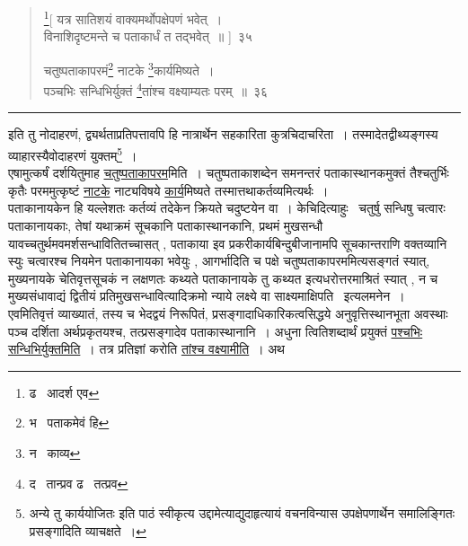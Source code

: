 \documentclass[11pt, openany]{book}
\begin{document}
\newpage

\begin{quote}
{\na \renewcommand{\thefootnote}{1}\footnote{ढ \textendash\ आदर्श एव}[ यत्र सातिशयं वाक्यमर्थोपक्षेपणं भवेत्~।\\
विनाशिदृष्टमन्ते च पताकार्धं त तद्भवेत्~॥ ]~३५

चतुष्पताकापरमं\renewcommand{\thefootnote}{2}\footnote{भ \textendash\ पताकमेवं हि} नाटके \renewcommand{\thefootnote}{3}\footnote{न \textendash\ काव्य}कार्यमिष्यते~।\\
पञ्चभिः सन्धिभिर्युक्तं \renewcommand{\thefootnote}{4}\footnote{द \textendash\ तान्प्रव ढ \textendash\ तत्प्रव}तांश्च वक्ष्याम्यतः परम्~॥~३६}
\end{quote}

\hrule

\vspace{2mm}
\noindent
इति तु नोदाहरणं, द्व्यर्थताप्रतिपत्तावपि हि नात्रार्थेन सहकारिता कुत्रचिदाचरिता~। तस्मादेतद्वीथ्यङ्गस्य व्याहारस्यैवोदाहरणं युक्तम्\renewcommand{\thefootnote}{1}\footnote{{\qt अन्ये तु कार्ययोजितः} इति पाठं स्वीकृत्य उद्दामेत्याद्युदाहृत्यायं वचनविन्यास उपक्षेपणार्थेन समालिङ्गितः प्रसङ्गादिति व्याचक्षते~।}~।\\

एषामुत्कर्षं दर्शयितुमाह \underline{चतुष्पताकापरम}मिति~। चतुष्पताकाशब्देन समनन्तरं पताकास्थानकमुक्तं तैश्चतुर्भिः कृतैः परममुत्कृष्टं \underline{नाटके} नाट्यविषये \underline{कार्य}मिष्यते तस्मात्तथाकर्तव्यमित्यर्थः~।\\

पताकानायकेन हि यल्लेशतः कर्तव्यं तदेकेन क्रियते चदुष्टयेन वा~। केचिदित्याहुः \textendash\ चतुर्षु सन्धिषु चत्वारः पताकानायकाः, तेषां यथाक्रमं सूचकानि पताकास्थानकानि, प्रथमं मुखसन्धौ यावच्चतुर्थमवमर्शसन्धावितितच्चासत् , पताकाया इव प्रकरीकार्यबिन्दुबीजानामपि सूचकान्तराणि वक्तव्यानि स्युः चत्वारश्च नियमेन पताकानायका भवेयुः , आगर्भादिति च पक्षे चतुष्पताकापरममित्यसङ्गतं स्यात्, मुख्यनायके चेतिवृत्तसूचकं न लक्षणतः कथ्यते पताकानायके तु कथ्यत इत्यधरोत्तरमाश्रितं स्यात् , न च मुख्यसंधावाद्यं द्वितीयं प्रतिमुखसन्धावित्यादिक्रमो न्याये लक्ष्ये वा साक्ष्यमाक्षिपति \textendash\ इत्यलमनेन~।\\

एवमितिवृत्तं व्याख्यातं, तस्य च भेदद्वयं निरूपितं, प्रसङ्गादाधिकारिकत्वसिद्धये अनुवृत्तिस्थानभूता अवस्थाः पञ्च दर्शिता अर्थप्रकृतयश्च, तत्प्रसङ्गादेव पताकास्थानानि~। अधुना त्वितिशब्दार्थं प्रयुक्तं \underline{पश्चभिः सन्धिभिर्युक्तमिति}~। तत्र प्रतिज्ञां करोति \underline{तांश्च वक्ष्यामीति}~। अथ
\end{document}
